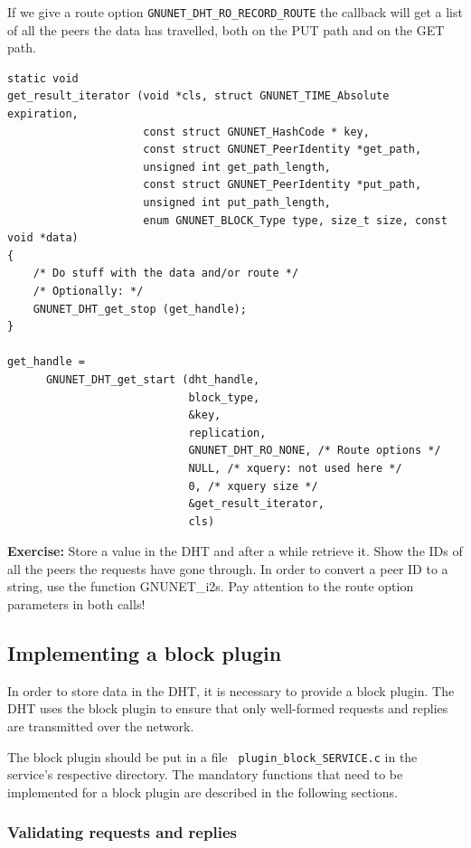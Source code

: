\documentclass[10pt]{article}
\newcommand{\exercise}[1]{\noindent\begin{boxedminipage}{\textwidth}{\bf Exercise:} #1 \end{boxedminipage}}
\begin{document}
If we give a route option {\tt GNUNET\_DHT\_RO\_RECORD\_ROUTE} the callback
will get a list of all the peers the data has travelled, both on the PUT
path and on the GET path.
\lstset{language=C}
\begin{lstlisting}
static void
get_result_iterator (void *cls, struct GNUNET_TIME_Absolute expiration,
                     const struct GNUNET_HashCode * key,
                     const struct GNUNET_PeerIdentity *get_path,
                     unsigned int get_path_length,
                     const struct GNUNET_PeerIdentity *put_path,
                     unsigned int put_path_length,
                     enum GNUNET_BLOCK_Type type, size_t size, const void *data)
{
    /* Do stuff with the data and/or route */
    /* Optionally: */
    GNUNET_DHT_get_stop (get_handle);
}

get_handle =
      GNUNET_DHT_get_start (dht_handle,
                            block_type,
                            &key,
                            replication,
                            GNUNET_DHT_RO_NONE, /* Route options */
                            NULL, /* xquery: not used here */
                            0, /* xquery size */
                            &get_result_iterator,
                            cls)
\end{lstlisting}

\exercise{Store a value in the DHT and after a while retrieve it. Show the IDs of all
the peers the requests have gone through. In order to convert a peer ID to a string, use
the function GNUNET\_i2s. Pay attention to the route option parameters in both calls!}

\subsection{Implementing a block plugin}

In order to store data in the DHT, it is necessary to provide a block
plugin.  The DHT uses the block plugin to ensure that only well-formed
requests and replies are transmitted over the network.

The block plugin should be put in a file {\tt
  plugin\_block\_SERVICE.c} in the service's respective directory. The
mandatory functions that need to be implemented for a block plugin are
described in the following sections.

\subsubsection{Validating requests and replies}
\end{document}
